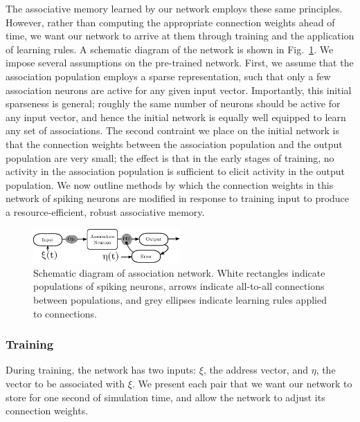 \documentclass[10pt,letterpaper]{article}
\newcommand{\fg}{Fig.}
\begin{document}
The associative memory learned by our network employs these same principles. However, rather than computing the appropriate connection weights ahead of time, we want our network to arrive at them through training and the application of learning rules. A schematic diagram of the network is shown in \fg~\ref{fig:schematic}. We impose several assumptions on the pre-trained network. 
First, we assume that the association population employs a sparse representation, such that only a few association neurons are active for any given input vector. Importantly, this initial sparseness is general; roughly the same number of neurons should be active for any input vector, and hence the initial network is equally well equipped to learn any set of associations. The second contraint we place on the initial network is that the connection weights between the association population and the output population are very small; the effect is that in the early stages of training, no activity in the association population is sufficient to elicit activity in the output population. We now outline methods by which the connection weights in this network of spiking neurons are modified in response to training input to produce a resource-efficient, robust associative memory.

\begin{figure}[b]
\begin{center}
\includegraphics[width=0.5\textwidth]{../diagrams/schematic.pdf}
\end{center}
\caption{Schematic diagram of association network. White rectangles indicate populations of spiking neurons, arrows indicate all-to-all connections between populations, and grey ellipses indicate learning rules applied to connections.}
\label{fig:schematic}
\end{figure}
\subsubsection{Training}
During training, the network has two inputs: $\xi$, the address vector, and $\eta$, the vector to be associated with $\xi$. We present each pair that we want our network to store for one second of simulation time, and allow the network to adjust its connection weights.
\end{document}
